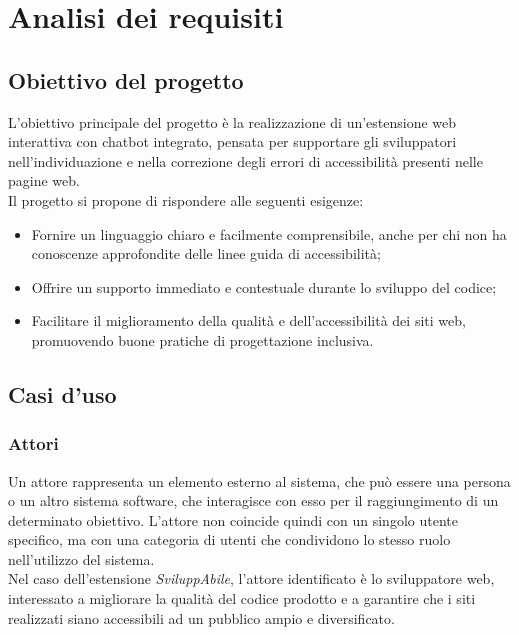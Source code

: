 \chapter{Analisi dei requisiti}
\label{chap:analisi-requisiti}

\section{Obiettivo del progetto}
\label{sec:obiettivo}
\noindent L’obiettivo principale del progetto è la realizzazione di un’estensione web interattiva con chatbot integrato, pensata per supportare gli sviluppatori nell’individuazione e nella correzione degli errori di accessibilità presenti nelle pagine web. \\Il progetto si propone di rispondere alle seguenti esigenze:
\begin{itemize}
    \item Fornire un linguaggio chiaro e facilmente comprensibile, anche per chi non ha conoscenze approfondite delle linee guida di accessibilità;
    \item Offrire un supporto immediato e contestuale durante lo sviluppo del codice;
    \item Facilitare il miglioramento della qualità e dell’accessibilità dei siti web, promuovendo buone pratiche di progettazione inclusiva.
\end{itemize}

\section{Casi d'uso}
\label{sec:uc}

\subsection{Attori}
\noindent Un attore rappresenta un elemento esterno al sistema, che può essere una persona o un altro sistema software, che interagisce con esso per il raggiungimento di un determinato obiettivo. L’attore non coincide quindi con un singolo utente specifico, ma con una categoria di utenti che condividono lo stesso ruolo nell’utilizzo del sistema.\\
Nel caso dell’estensione \textit{SviluppAbile}, l’attore identificato è lo sviluppatore web, interessato a migliorare la qualità del codice prodotto e a garantire che i siti realizzati siano accessibili ad un pubblico ampio e diversificato.


